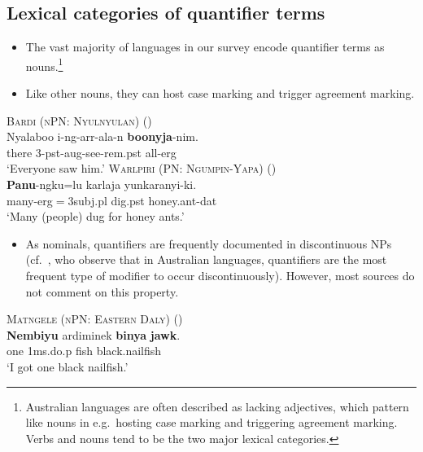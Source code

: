\documentclass{article}
\begin{document}
\subsection{Lexical categories of quantifier terms}

\begin{itemize}
    \item The vast majority of languages in our survey encode quantifier terms as nouns.\footnote{Australian languages are often described as lacking adjectives, which pattern like nouns in e.g.\ hosting case marking and triggering agreement marking. Verbs and nouns tend to be the two major lexical categories.}
    \item Like other nouns, they can host case marking and trigger agreement marking.
\end{itemize}

\begin{exe}
\ex\label{allerg} \textsc{Bardi (nPN: Nyulnyulan)} (\citealt[272]{bowern12})\\
\gll Nyalaboo i-ng-arr-ala-n \textbf{boonyja}-nim.\\
there 3-{\sc pst}-{\sc aug}-see-{\sc rem.pst} all-{\sc erg}\\
\glt `Everyone saw him.'
\ex \textsc{Warlpiri (PN: Ngumpin-Yapa)} (\citealt[6]{bowler17})\\
\gll \textbf{Panu}-ngku=lu karlaja yunkaranyi-ki.\\
many-{\sc erg}$=${\sc 3subj.pl} dig.{\sc pst} honey.ant-{\sc dat}\\
\glt `Many (people) dug for honey ants.'
\end{exe}

\begin{itemize}
    \item As nominals, quantifiers are frequently documented in discontinuous NPs (cf.\ \citealt[51--52]{louagieverstraete16}, who observe that in Australian languages, quantifiers are the most frequent type of modifier to occur discontinuously). However, most sources do not comment on this property.
\end{itemize}

\begin{exe}
\ex \textsc{Matngele (nPN: Eastern Daly)} (\citealt[54]{zandvoort99})\\
\gll \textbf{Nembiyu} ardiminek \textbf{binya} \textbf{jawk}.\\
one 1{\sc ms.}do.{\sc p} fish black.nailfish\\
\glt `I got one black nailfish.' %
\end{exe}
\end{document}
